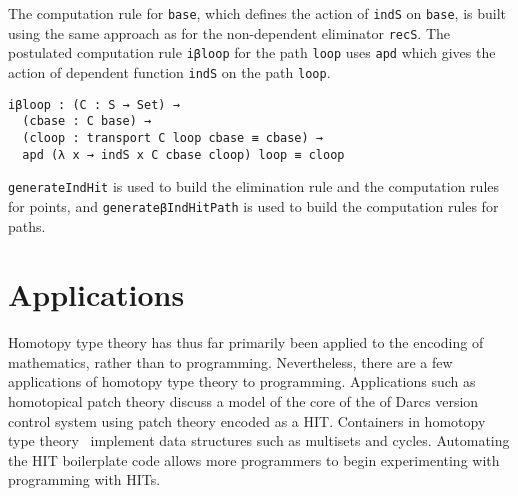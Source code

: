 \documentclass[runningheads]{llncs}
\begin{document}
The computation rule for {\tt base}, which defines the action of {\tt indS} on {\tt base}, is built using the same approach as for the non-dependent eliminator {\tt recS}.
The postulated computation rule {\tt iβloop} for the path {\tt loop} uses {\tt apd} which gives the action of dependent function {\tt indS} on the path {\tt loop}.
\begin{center}
\fontsize{7.9pt}{2pt}\selectfont
\begin{BVerbatim}
iβloop : (C : S → Set) → 
  (cbase : C base) → 
  (cloop : transport C loop cbase ≡ cbase) → 
  apd (λ x → indS x C cbase cloop) loop ≡ cloop
\end{BVerbatim}
\end{center}

{\tt generateIndHit} is used to build the elimination rule and the computation rules for points, and {\tt generateβIndHitPath} is used to build the computation rules for paths. 



\section{Applications}

Homotopy type theory has thus far primarily been applied to the encoding of mathematics, rather than to programming.
Nevertheless, there are a few  applications of homotopy type theory to programming. Applications such as homotopical patch theory \cite{Angiuli-2014} discuss a model of the core of the of Darcs \cite{Darcs-2005} version control system using patch theory \cite{Mimram-2013} encoded as a HIT. Containers in homotopy type theory~\cite{Altenkirch-2014,Abbott-2005} implement data structures such as multisets and cycles. Automating the HIT boilerplate code allows more programmers to begin experimenting with programming with HITs.
\end{document}
